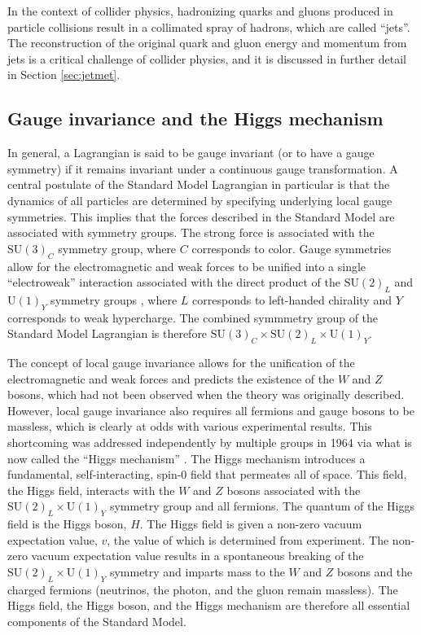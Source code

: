 In the context of collider physics, hadronizing quarks and gluons produced 
in particle collisions result in a collimated spray of hadrons, which are called ``jets''.
The reconstruction of the original quark and gluon energy and momentum from jets is a critical
challenge of collider physics, and it is discussed in further detail in Section \ref{sec:jetmet}.

\subsection{Gauge invariance and the Higgs mechanism}

In general, a Lagrangian is said to be gauge invariant (or to have a gauge symmetry)
if it remains invariant under a continuous gauge transformation.  
A central postulate of the Standard Model Lagrangian in particular is that the
dynamics of all particles are determined by specifying underlying local gauge symmetries.
This implies that the forces described in the Standard Model are associated with symmetry groups.
The strong force is associated with the $\text{SU}(3)_{C}$ symmetry group, where
$C$ corresponds to color.
Gauge symmetries allow for the electromagnetic and weak forces to be unified into a single ``electroweak'' interaction
associated with the direct product of the $\text{SU}(2)_{L}$ and $\text{U}(1)_{Y}$ symmetry 
groups \cite{glashow,weinberg,salam:1968}, where 
$L$ corresponds to left-handed chirality and $Y$ corresponds to weak hypercharge.
The combined symmmetry group of the Standard Model Lagrangian is therefore 
$\text{SU}(3)_{C} \times \text{SU}(2)_{L} \times \text{U}(1)_{Y}$.

The concept of local gauge invariance allows
for the unification of the electromagnetic and weak forces 
and predicts the existence of the $W$ and $Z$ bosons,
which had not been observed when the theory was originally described.
However, local gauge invariance also requires all 
fermions and gauge bosons to be massless, which is clearly
at odds with various experimental results.  This shortcoming was 
addressed independently by multiple groups in 1964 via what is now 
called the ``Higgs mechanism'' \cite{higgs,englert,guralnik}.
The Higgs mechanism introduces a fundamental, self-interacting,
spin-$0$ field that permeates all of space.
This field, the Higgs field, interacts with the $W$ and $Z$ bosons
associated with the $\text{SU}(2)_{L} \times \text{U}(1)_{Y}$ 
symmetry group and all fermions.  
The quantum of the Higgs field is the Higgs boson, $H$.
The Higgs field is given a non-zero vacuum expectation value, $v$, the value of which
is determined from experiment. 
The non-zero vacuum expectation value results in a spontaneous breaking of the 
$\text{SU}(2)_{L} \times \text{U}(1)_{Y}$ symmetry and imparts mass
to the $W$ and $Z$ bosons and the charged fermions (neutrinos, the photon, and the gluon
remain massless).  The Higgs field, the Higgs boson, and the Higgs
mechanism are therefore all essential components of the Standard Model.


